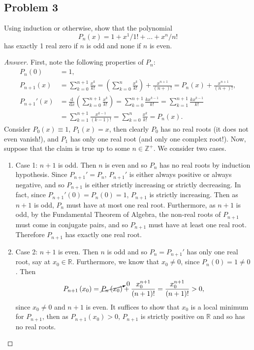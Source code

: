 \documentclass[12pt]{article}
\newcommand{\z}{\mathbb{Z}}
\newcommand{\real}{\mathbb{R}}
\newcommand\paren[1]{\left( #1 \right)}
\newcommand{\rd}{\mathrm{d}}
\theoremstyle{definition}
\begin{document}
\subsection{Problem 3 \texorpdfstring{\cite{Melody}}{}}
Using induction or otherwise, show that the polynomial 
\[
    P_n(x) = 1 + x^1 / 1! + ... + x^n / n!
\]
has exactly 1 real zero if $n$ is odd and none if $n$ is even. 
\begin{proof}[Answer]
    First, note the following properties of $P_n$:
    \begin{align*}
        P_n(0) & = 1 , \\ 
        P_{n+1}(x) & = \sum\limits_{k = 0}^{n+1} \frac{ x^{k} }{k!} = \paren{ \sum\limits_{k = 0}^n \frac{ x^{k} }{k!} } + \frac{x^{n+1}}{(n+)!} = P_n(x) + \frac{x^{n+1}}{(n+)!} , \\ 
        P_{n+1}'(x) & = \frac{\rd}{\rd x} \paren{ \sum\limits_{k = 0}^{n+1} \frac{ x^{k} }{k!} } = \sum\limits_{k = 0}^{n+1} \frac{ k x^{k-1} }{k!} = \sum\limits_{k = 1}^{n+1} \frac{k x^{k-1}}{k!} \\ 
        & = \sum\limits_{k = 1}^{n+1} \frac{x^{k-1}}{(k-1)!} = \sum\limits_{k = 0}^n \frac{x^k}{k!} = P_n(x) . 
    \end{align*}
    Consider $P_0(x) \equiv 1$, $P_1(x) = x$, then clearly $P_0$ has no real roots (it does not even vanish!), and $P_1$ has only one real root (and only one complex root!). Now, suppose that the claim is true up to some $n \in \z^+$. We consider two cases. 
    \begin{enumerate}
        \item Case 1: $n+1$ is odd. Then $n$ is even and so $P_n$ has no real roots by induction hypothesis. Since $P_{n+1}' = P_n$, $P_{n+1}'$ is either always positive or always negative, and so $P_{n+1}$ is either strictly increasing or strictly decreasing. In fact, since $P_{n+1}'(0) = P_n(0) = 1$, $P_{n+1}$ is strictly increasing. Then as $n+1$ is odd, $P_n$ must have at most one real root. Furthermore, as $n+1$ is odd, by the Fundamental Theorem of Algebra, the non-real roots of $P_{n+1}$ must come in conjugate pairs, and so $P_{n+1}$ must have at least one real root. Therefore $P_{n+1}$ has exactly one real root. 
        \item Case 2: $n+1$ is even. Then $n$ is odd and so $P_n = P_{n+1}'$ has only one real root, say at $x_0 \in \real$. Furthermore, we know that $x_0 \neq 0$, since $P_n(0) = 1 \neq 0$. Then 
        \[
            P_{n+1} \paren{ x_0 } = \cancelto{0}{ P_n \paren{ x_0 } } + \frac{x_0^{n+1}}{(n+1)!} = \frac{x_0^{n+1}}{(n+1)!} > 0 , 
        \]
        since $x_0 \neq 0$ and $n+1$ is even. It suffices to show that $x_0$ is a local minimum for $P_{n+1}$, then as $P_{n+1} \paren{ x_0 } > 0$, $P_{n+1}$ is strictly positive on $\real$ and so has no real roots. 
        

\end{enumerate}
\end{proof}
\end{document}
